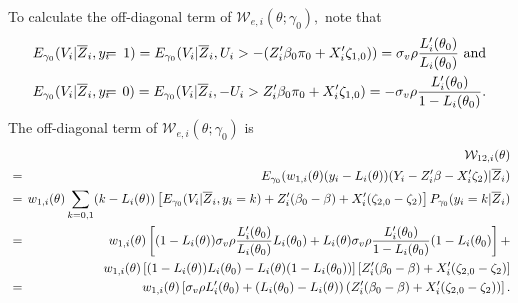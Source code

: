 \documentclass[12pt,thmsb,titlepage,final,oneside,letterpaper]{article}
\begin{document}
To calculate the off-diagonal term of $\mathcal{W}_{e,i}(\theta ;\gamma
_{0}),$ note that%
\begin{eqnarray}
E_{\gamma _{0}}(V_{i}|\overline{Z}_{i},y_{i}\hspace{-0.08in} &=&\hspace{%
-0.08in}1)=E_{\gamma _{0}}(V_{i}|\overline{Z}_{i},U_{i}>-(Z_{i}^{\prime
}\beta _{0}\pi _{0}+X_{i}^{\prime }\zeta _{1,0}))=\sigma _{v}\rho \frac{%
L_{i}^{\prime }(\theta _{0})}{L_{i}(\theta _{0})}\text{ and}  \notag \\
E_{\gamma _{0}}(V_{i}|\overline{Z}_{i},y_{i}\hspace{-0.08in} &=&\hspace{%
-0.08in}0)=E_{\gamma _{0}}(V_{i}|\overline{Z}_{i},-U_{i}>Z_{i}^{\prime
}\beta _{0}\pi _{0}+X_{i}^{\prime }\zeta _{1,0})=-\sigma _{v}\rho \frac{%
L_{i}^{\prime }(\theta _{0})}{1-L_{i}(\theta _{0})}\text{.}
\end{eqnarray}%
The off-diagonal term of $\mathcal{W}_{e,i}(\theta ;\gamma _{0})$ is%
\begin{eqnarray}
&&\mathcal{W}_{12,i}(\theta )  \notag \\
\hspace{-0.08in} &=&\hspace{-0.08in}E_{\gamma _{0}}(w_{1,i}(\theta
)(y_{i}-L_{i}(\theta ))(Y_{i}-Z_{i}^{\prime }\beta -X_{i}^{\prime }\zeta
_{2})|\overline{Z}_{i})  \notag \\
\hspace{-0.08in} &=&\hspace{-0.08in}w_{1,i}(\theta
)\sum_{k=0,1}(k-L_{i}(\theta ))\left[ E_{\gamma _{0}}(V_{i}|\overline{Z}%
_{i},y_{i}=k)+Z_{i}^{\prime }(\beta _{0}-\beta )+X_{i}^{\prime }(\zeta
_{2,0}-\zeta _{2})\right] P_{\gamma _{0}}(y_{i}=k|\overline{Z}_{i})  \notag
\\
\hspace{-0.08in} &=&\hspace{-0.08in}w_{1,i}(\theta )\left[ (1-L_{i}(\theta
))\sigma _{v}\rho \frac{L_{i}^{\prime }(\theta _{0})}{L_{i}(\theta _{0})}%
L_{i}(\theta _{0})+L_{i}(\theta )\sigma _{v}\rho \frac{L_{i}^{\prime
}(\theta _{0})}{1-L_{i}(\theta _{0})}(1-L_{i}(\theta _{0})\right] +  \notag
\\
&&w_{1,i}(\theta )\left[ (1-L_{i}(\theta ))L_{i}(\theta _{0})-L_{i}(\theta
)(1-L_{i}(\theta _{0}))\right] \left[ Z_{i}^{\prime }(\beta _{0}-\beta
)+X_{i}^{\prime }(\zeta _{2,0}-\zeta _{2})\right]   \notag \\
\hspace{-0.08in} &=&\hspace{-0.08in}w_{1,i}(\theta )\left[ \sigma _{v}\rho
L_{i}^{\prime }(\theta _{0})+\left( L_{i}(\theta _{0})-L_{i}(\theta )\right)
\left( Z_{i}^{\prime }(\beta _{0}-\beta )+X_{i}^{\prime }(\zeta _{2,0}-\zeta
_{2})\right) \right] .  \label{Probit_W12}
\end{eqnarray}
\end{document}
